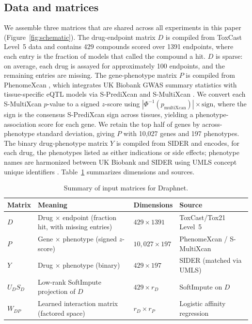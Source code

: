 \documentclass[11pt]{article}
\begin{document}
\subsection{Data and matrices}

We assemble three matrices that are shared across all experiments in
this paper (Figure~\ref{fig:schematic}). The drug-endpoint matrix $D$
is compiled from ToxCast Level~5 data \citep{richard2016toxcast} and
contains 429 compounds scored over 1391 endpoints, where each entry is
the fraction of models that called the compound a hit. $D$ is sparse:
on average, each drug is assayed for approximately 100 endpoints, and
the remaining entries are missing. The gene-phenotype matrix $P$ is
compiled from PhenomeXcan \citep{pividori2020phenomexcan}, which
integrates UK Biobank GWAS summary statistics with tissue-specific eQTL
models via S-PrediXcan and S-MultiXcan
\citep{barbeira2018spredixcan,barbeira2019smultixcan}. We convert each
S-MultiXcan $p$-value to a signed $z$-score using
$|\Phi^{-1}(p_{\text{multiXcan}})| \times \mathrm{sign}$, where the
sign is the consensus S-PrediXcan sign across tissues, yielding a
phenotype-association score for each gene. We retain the top half of
genes by across-phenotype standard deviation, giving $P$ with 10,027
genes and 197 phenotypes. The binary drug-phenotype matrix $Y$ is
compiled from SIDER \citep{kuhn2016sider} and encodes, for each drug,
the phenotypes listed as either indications or side effects; phenotype
names are harmonized between UK Biobank and SIDER using UMLS concept
unique identifiers \citep{bodenreider2004umls}. Table~\ref{tab:matrices}
summarizes dimensions and sources.

\begin{table}[htbp]
\centering
\caption{Summary of input matrices for Draphnet.}
\label{tab:matrices}
\begin{tabular}{llll}
\toprule
Matrix & Meaning & Dimensions & Source \\
\midrule
$D$ & Drug $\times$ endpoint (fraction hit, with missing entries) & $429 \times 1391$ & ToxCast/Tox21 Level~5 \\
$P$ & Gene $\times$ phenotype (signed $z$-score) & $10{,}027 \times 197$ & PhenomeXcan / S-MultiXcan \\
$Y$ & Drug $\times$ phenotype (binary) & $429 \times 197$ & SIDER (matched via UMLS) \\
$U_D S_D$ & Low-rank SoftImpute projection of $D$ & $429 \times r_D$ & SoftImpute on $D$ \\
$W_{DP}$ & Learned interaction matrix (factored space) & $r_D \times r_P$ & Logistic affinity regression \\
\bottomrule
\end{tabular}
\end{table}
\end{document}
